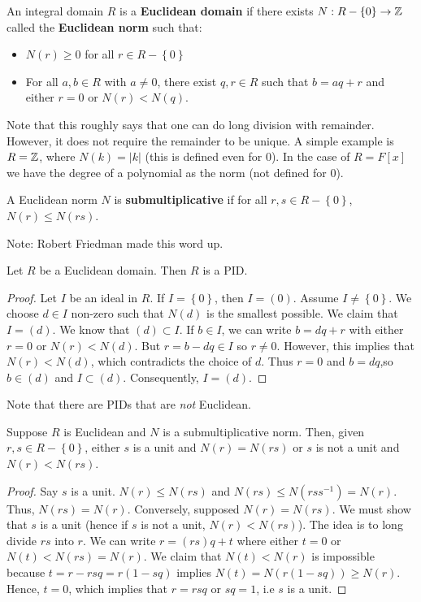\documentclass{../mathnotes}
\begin{document}
\begin{defn}
    An integral domain $R$ is a \textbf{Euclidean domain} if there exists $N:R-\left\{ 0 \right\}\to\mathbb{Z}$
    called the \textbf{Euclidean norm} such that:
    \begin{itemize}
        \item $N(r)\geq0$ for all $r\in R-\left\{ 0 \right\}$
        \item For all $a,b\in R$ with $a\neq 0$, there exist $q,r\in R$ such that $b=aq+r$ and either
            $r=0$ or $N(r)<N(q)$.
    \end{itemize}
\end{defn}

Note that this roughly says that one can do long division with remainder. However, it does not require the remainder to be unique.
A simple example is $R=\mathbb{Z}$, where $N(k)=|k|$ (this is defined even for 0). In the case of $R=F[x]$ we have the degree of a polynomial
as the norm (not defined for 0).

\begin{defn}
    A Euclidean norm $N$ is \textbf{submultiplicative} if for all $r,s\in R-\left\{ 0 \right\}$, $N(r)\leq N(rs)$.
\end{defn}
Note: Robert Friedman made this word up.

\begin{thm}
    Let $R$ be a Euclidean domain. Then $R$ is a PID.
\end{thm}
\begin{proof}
    Let $I$ be an ideal in $R$. If $I=\left\{ 0 \right\}$, then $I=(0)$. Assume $I\neq\left\{ 0 \right\}$.
    We choose $d\in I$ non-zero such that $N(d)$ is the smallest possible. We claim that $I=(d)$. We know that
    $(d)\subset I$. If $b\in I$, we can write $b=dq+r$ with either $r=0$ or $N(r)<N(d)$. But $r=b-dq\in I$
    so $r\neq 0$. However, this implies that $N(r)<N(d)$, which contradicts the choice of $d$. Thus $r=0$
    and $b=dq$,so $b\in(d)$ and $I\subset(d)$. Consequently, $I=(d)$.
\end{proof}

Note that there are PIDs that are \textit{not} Euclidean.

\begin{lem}
    Suppose $R$ is Euclidean and $N$ is a submultiplicative norm. Then, given $r,s\in R-\left\{ 0 \right\}$, either $s$ is a unit
    and $N(r)=N(rs)$ or $s$ is not a unit and $N(r)<N(rs)$.
\end{lem}
\begin{proof}
    Say $s$ is a unit. $N(r)\leq N(rs)$ and $N(rs)\leq N(rs s^{-1})=N(r)$. Thus, $N(rs)=N(r)$. Conversely, supposed $N(r)=N(rs)$.
    We must show that $s$ is a unit (hence if $s$ is not a unit, $N(r)<N(rs)$). The idea is to long divide $rs$ into $r$.
    We can write $r=(rs)q+t$ where either $t=0$ or $N(t)<N(rs)=N(r)$. We claim that $N(t)<N(r)$ is impossible because
    $t=r-rsq=r(1-sq)$ implies $N(t)=N(r(1-sq))\geq N(r)$. Hence, $t=0$, which implies that $r=rsq$ or $sq=1$, i.e $s$ is a unit.
\end{proof}
\end{document}
